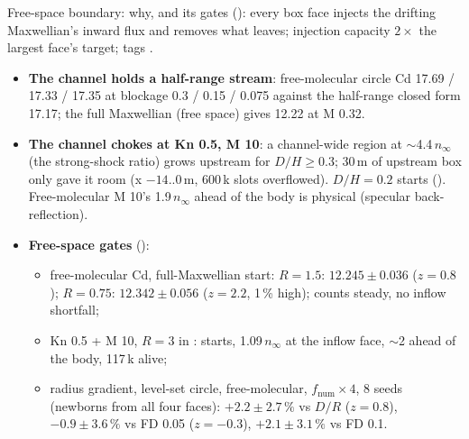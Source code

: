 \documentclass[10pt,aspectratio=169]{beamer}
\begin{document}
\begin{frame}{Free-space boundary: why, and its gates}
\scriptsize
{} (): every box face injects the drifting Maxwellian's inward flux and
removes what leaves; injection capacity $2\times$ the largest face's target; tags .
\begin{itemize}
\item \textbf{The channel holds a half-range stream}: free-molecular circle Cd 17.69 / 17.33 / 17.35 at blockage 0.3 / 0.15 / 0.075
  against the half-range closed form 17.17; the full Maxwellian (free space) gives 12.22 at M 0.32.
\item \textbf{The channel chokes at Kn 0.5, M 10}: a channel-wide region at $\sim$4.4\,$n_\infty$ (the strong-shock ratio) grows upstream
  for $D/H\ge0.3$; 30\,m of upstream box only gave it room (x $-14$..0\,m, 600\,k slots overflowed).  $D/H = 0.2$ starts
  ().  Free-molecular M 10's 1.9\,$n_\infty$ ahead of the body is physical (specular back-reflection).
\item \textbf{Free-space gates} ():
  \begin{itemize}\scriptsize
  \item free-molecular Cd, full-Maxwellian start: $R = 1.5$: $12.245\pm0.036$ ($z = 0.8$); $R = 0.75$: $12.342\pm0.056$ ($z = 2.2$, 1\,\% high);
    counts steady, no inflow shortfall;
  \item Kn 0.5 + M 10, $R = 3$ in : starts, 1.09\,$n_\infty$ at the inflow face, $\sim$2 ahead of the body, 117\,k alive;
  \item radius gradient, level-set circle, free-molecular, $f_{\mathrm{num}}\times4$, 8 seeds (newborns from all four faces):
    $+2.2\pm2.7\,\%$ vs $D/R$ ($z = 0.8$), $-0.9\pm3.6\,\%$ vs FD 0.05 ($z = -0.3$), $+2.1\pm3.1\,\%$ vs FD 0.1.
  \end{itemize}
\end{itemize}
\end{frame}
\end{document}
